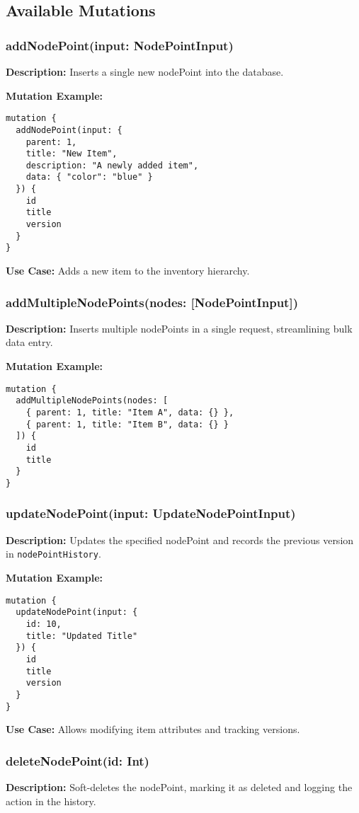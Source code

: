 \documentclass[12pt,a4paper]{article}
\begin{document}
\subsection{Available Mutations}
\subsubsection{addNodePoint(input: NodePointInput)}
\textbf{Description:}
Inserts a single new nodePoint into the database.

\noindent \textbf{Mutation Example:}
\begin{verbatim}
mutation {
  addNodePoint(input: {
    parent: 1,
    title: "New Item",
    description: "A newly added item",
    data: { "color": "blue" }
  }) {
    id
    title
    version
  }
}
\end{verbatim}

\noindent \textbf{Use Case:}
Adds a new item to the inventory hierarchy.

\subsubsection{addMultipleNodePoints(nodes: [NodePointInput])}
\textbf{Description:}
Inserts multiple nodePoints in a single request, streamlining bulk data entry.

\noindent \textbf{Mutation Example:}
\begin{verbatim}
mutation {
  addMultipleNodePoints(nodes: [
    { parent: 1, title: "Item A", data: {} },
    { parent: 1, title: "Item B", data: {} }
  ]) {
    id
    title
  }
}
\end{verbatim}

\subsubsection{updateNodePoint(input: UpdateNodePointInput)}
\textbf{Description:}
Updates the specified nodePoint and records the previous version in \texttt{nodePointHistory}.

\noindent \textbf{Mutation Example:}
\begin{verbatim}
mutation {
  updateNodePoint(input: {
    id: 10,
    title: "Updated Title"
  }) {
    id
    title
    version
  }
}
\end{verbatim}

\noindent \textbf{Use Case:}
Allows modifying item attributes and tracking versions.

\subsubsection{deleteNodePoint(id: Int)}
\textbf{Description:}
Soft-deletes the nodePoint, marking it as deleted and logging the action in the history.
\end{document}
